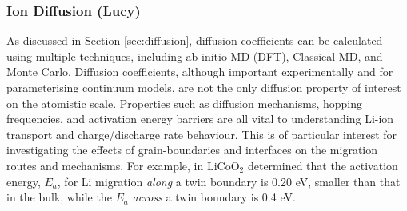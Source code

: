 \documentclass[../main.tex]{subfiles}
\begin{document}

\subsubsection{Ion Diffusion (Lucy)}
\label{sec:cathode_ion_diffusion}
As discussed in Section \ref{sec:diffusion}, diffusion coefficients can be calculated using multiple techniques, including ab-initio MD (DFT), Classical MD, and Monte Carlo. Diffusion coefficients, although important experimentally and for parameterising continuum models, are not the only diffusion property of interest on the atomistic scale. Properties such as diffusion mechanisms, hopping frequencies, and activation energy barriers are all vital to understanding Li-ion transport and charge/discharge rate behaviour. This is of particular interest for investigating the effects of grain-boundaries and interfaces on the migration routes and mechanisms. For example, in LiCoO$_2$ \citeauthor{moriwake2013first} determined that the activation energy, $E_a$, for Li migration \textit{along} a twin boundary is 0.20 eV, smaller than that in the bulk, while the $E_a$ \textit{across} a twin boundary is 0.4 eV. \cite{moriwake2013first}
\end{document}

